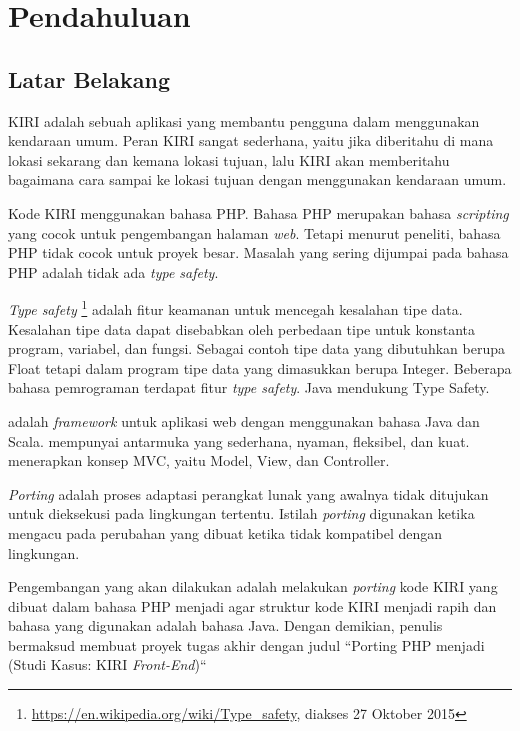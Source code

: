 \chapter{Pendahuluan}
\label{chap:pendahuluan}

\section{Latar Belakang}
\label{sec:latarbelakang}

KIRI \cite{statickiri} adalah sebuah aplikasi yang membantu pengguna dalam menggunakan kendaraan umum. Peran KIRI sangat sederhana, yaitu jika diberitahu di mana lokasi sekarang dan kemana lokasi tujuan, lalu KIRI akan memberitahu bagaimana cara sampai ke lokasi tujuan dengan menggunakan kendaraan umum. 

Kode KIRI \cite{githubkiri} menggunakan bahasa PHP. Bahasa PHP \cite{phpnet} merupakan bahasa \textit{scripting} yang cocok untuk pengembangan halaman \textit{web}. Tetapi menurut peneliti, bahasa PHP tidak cocok untuk proyek besar. Masalah yang sering dijumpai pada bahasa PHP adalah tidak ada \textit{type safety}. 

\textit{Type safety} \footnote{ \url{https://en.wikipedia.org/wiki/Type_safety}, diakses 27 Oktober 2015} adalah fitur keamanan untuk mencegah kesalahan tipe data. Kesalahan tipe data dapat disebabkan oleh perbedaan tipe untuk konstanta program, variabel, dan fungsi. Sebagai contoh tipe data yang dibutuhkan berupa Float tetapi dalam program tipe data yang dimasukkan berupa Integer. Beberapa bahasa pemrograman terdapat fitur \textit{type safety}. Java mendukung Type Safety.

\play adalah \textit{framework} untuk aplikasi web dengan menggunakan bahasa Java dan Scala. \play mempunyai antarmuka yang sederhana, nyaman, fleksibel, dan kuat. \play menerapkan konsep MVC, yaitu Model, View, dan Controller\cite{playforjava}. 

\textit{Porting} adalah proses adaptasi perangkat lunak yang awalnya tidak ditujukan untuk dieksekusi pada lingkungan tertentu. Istilah \textit{porting} digunakan ketika mengacu pada perubahan yang dibuat ketika tidak kompatibel dengan lingkungan.

Pengembangan yang akan dilakukan adalah melakukan \textit{porting} kode KIRI yang dibuat dalam bahasa PHP menjadi \play agar struktur kode KIRI menjadi rapih dan bahasa yang digunakan adalah bahasa Java. Dengan demikian, penulis bermaksud membuat proyek tugas akhir dengan judul ``Porting PHP menjadi \play (Studi Kasus: KIRI \textit{Front-End})``


